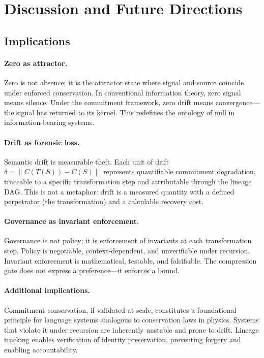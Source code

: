 \documentclass[11pt,a4paper]{article}
\begin{document}
\section{Discussion and Future Directions}
\label{sec:discussion}

\subsection{Implications}

\paragraph{Zero as attractor.}
Zero is not absence; it is the attractor state where signal and source coincide under enforced conservation. In conventional information theory, zero signal means silence. Under the commitment framework, zero drift means convergence---the signal has returned to its kernel. This redefines the ontology of null in information-bearing systems.

\paragraph{Drift as forensic loss.}
Semantic drift is measurable theft. Each unit of drift $\delta = \| C(T(S)) - C(S) \|$ represents quantifiable commitment degradation, traceable to a specific transformation step and attributable through the lineage DAG. This is not a metaphor: drift is a measured quantity with a defined perpetrator (the transformation) and a calculable recovery cost.

\paragraph{Governance as invariant enforcement.}
Governance is not policy; it is enforcement of invariants at each transformation step. Policy is negotiable, context-dependent, and unverifiable under recursion. Invariant enforcement is mathematical, testable, and falsifiable. The compression gate does not express a preference---it enforces a bound.

\paragraph{Additional implications.}
Commitment conservation, if validated at scale, constitutes a foundational principle for language systems analogous to conservation laws in physics. Systems that violate it under recursion are inherently unstable and prone to drift. Lineage tracking enables verification of identity preservation, preventing forgery and enabling accountability.
\end{document}
